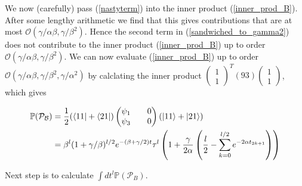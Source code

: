 \documentclass{article}
\begin{document}
We now (carefully) pass (\ref{nastyterm}) into the inner product (\ref{inner_prod_B}). After some lengthy arithmetic we find that this gives contributions that are at most $\mathcal{O}(\gamma/\alpha\beta, \gamma/\beta^2)$. Hence the second term in (\ref{sandwiched_to_gamma2}) does not contribute to the inner product (\ref{inner_prod_B}) up to order $\mathcal{O}(\gamma/\alpha\beta, \gamma/\beta^2)$. We can now evaluate (\ref{inner_prod_B}) up to order $\mathcal{O}(\gamma/\alpha\beta, \gamma/\beta^2, \gamma/\alpha^2)$ by calclating the inner product $\begin{pmatrix} 1 \\ 1 \end{pmatrix}^T(93)\begin{pmatrix} 1 \\ 1 \end{pmatrix}$, which gives

\begin{align}
\mathbb{P}(\mathcal{P_B}) &= \frac{1}{2}(\bra{11}+\bra{21})\begin{pmatrix} \psi_1 && 0 \\ \psi_3 && 0 \end{pmatrix} (\ket{11} + \ket{21}) \nonumber \\
&= \beta^{l}(1+\gamma/\beta)^{l/2} e^{-(\beta+\gamma/2)t}\tau^l \left (1 + \frac{\gamma}{2\alpha}\left(\frac{l}{2} - \sum_{k=0}^{l/2}e^{-2\alpha t_{2k+1}}\right)\right)
\end{align}


Next step is to calculate $\int dt^l \mathbb{P}(\mathcal{P}_B)$.
\end{document}
